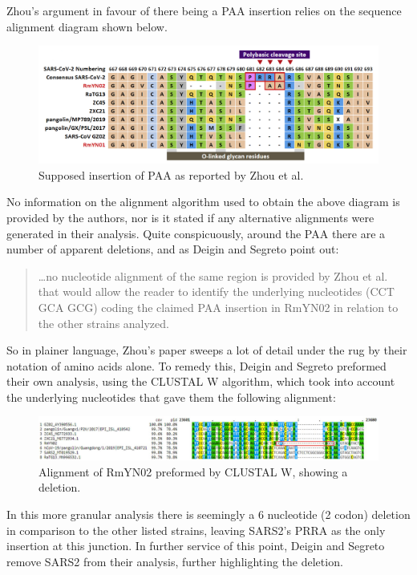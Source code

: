 \documentclass[11pt]{article}
\begin{document}
\begin{enumerate}
Zhou's argument in favour of there being a PAA insertion relies on the sequence alignment diagram shown below.

\begin{figure}[htbp]
\centering
\includegraphics[width=.9\linewidth]{./images/paa-insertion.png}
\caption{Supposed insertion of PAA as reported by Zhou et al.}
\end{figure}

No information on the alignment algorithm used to obtain the above diagram is provided by the authors, nor is it stated if any alternative alignments were generated in their analysis. Quite conspicuously, around the PAA there are a number of apparent deletions, and as Deigin and Segreto point out:
\begin{quote}
\ldots{}no nucleotide alignment of the same region is provided by Zhou et al. that would allow the reader to identify the underlying nucleotides (CCT GCA GCG) coding the claimed PAA insertion in RmYN02 in relation to the other strains analyzed.
\end{quote}
So in plainer language, Zhou's paper sweeps a lot of detail under the rug by their notation of amino acids alone. To remedy this, Deigin and Segreto preformed their own analysis, using the CLUSTAL W algorithm, which took into account the underlying nucleotides that gave them the following alignment:

\begin{figure}[htbp]
\centering
\includegraphics[width=.9\linewidth]{./images/paa-insertion-underlying-nucleotides.png}
\caption{Alignment of RmYN02 preformed by CLUSTAL W, showing a deletion.}
\end{figure}

In this more granular analysis there is seemingly a 6 nucleotide (2 codon) deletion in comparison to the other listed strains, leaving SARS2's PRRA as the only insertion at this junction. In further service of this point, Deigin and Segreto remove SARS2 from their analysis, further highlighting the deletion.


\end{enumerate}
\end{document}
